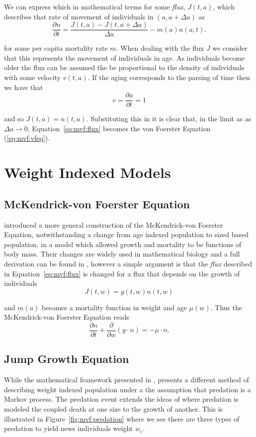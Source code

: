 \documentclass[../main.tex]{subfiles}
\begin{document}
  We can express which in mathematical terms for some \emph{flux}, $J(t, a)$, which describes that rate of movement of individuals in $(a, a + \Delta a)$ as
  \begin{equation}\label{eq:mvf:flux}
    \frac{\partial n}{\partial t} = \frac{J(t, a) - J(t, a + \Delta a)}{\Delta a} - m(a) n(a, t).
  \end{equation}

  for some per capita mortality rate $m$. When dealing with the flux $J$ we consider that this represents the movement of individuals in age. As individuals become older the flux can be assumed the be proportional to the density of individuals with some velocity $v(t, a)$. If the aging corresponds to the parsing of time then we have that
  $$ v = \frac{\partial a}{\partial t} = 1$$

  and so $J(t, a) = n(t, a)$. Substituting this in it is clear that, in the limit as as $\Delta a \to 0$, Equation~\ref{eq:mvf:flux} becomes the von Foerster Equation (\ref{eq:mvf:vfeq}).

  \section{Weight Indexed Models}
  \subsection{McKendrick-von Foerster Equation}
  \cite{silvert1978} introduced a more general construction of the McKendrick-von Foerster Equation, notwithstanding a change from age indexed population to sized based population, in a model which allowed growth and mortality to be functions of body mass. Their changes are widely used in mathematical biology and a full derivation can be found in \cite{silvert1978}, however a simple argument is that the \emph{flux} described in Equation~\ref{eq:mvf:flux} is changed for a flux that depends on the growth of individuals
  $$J(t, w) = g(t, w)n(t, w)$$

  and $m(a)$ becomes a mortality function in weight and age $\mu(w)$. Thus the McKendrick-von Foerster Equation reads
  \begin{equation}\label{eq:mvf:mvf}
    \frac{\partial n}{\partial t} + \frac{\partial}{\partial w} \left(g \cdot n \right) = - \mu \cdot n.
  \end{equation}

  \subsection{Jump Growth Equation}
  While the mathematical framework presented in \cite{silvert1978}, \cite{datta2010} presents a different method of describing weight indexed population under a the assumption that predation is a Markov process. The predation event extends the ideas of \cite{silvert1980} where predation is modeled the coupled death at one size to the growth of another. This is illustrated in Figure~\ref{fig:mvf:predation} where we see there are three types of predation to yield news individuals weight $w_c$.
\end{document}
